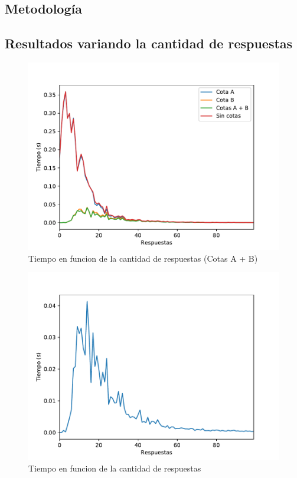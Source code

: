 \documentclass{article}
\begin{document}
\subsection{Metodología}

\subsection{Resultados variando la cantidad de respuestas}

\begin{figure}
\caption{Tiempo en funcion de la cantidad de respuestas (Cotas A + B)}
\centering
\includegraphics[scale=0.5]{Respuestas_st.pdf}
\end{figure}

\begin{figure}
\caption{Tiempo en funcion de la cantidad de respuestas}
\centering
\includegraphics[scale=0.5]{Respuestas_AB_st.pdf}
\end{figure}
\end{document}

